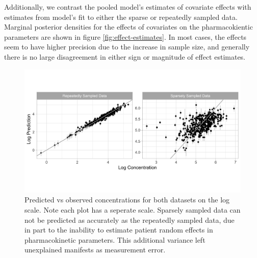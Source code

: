 Additionally, we contrast the pooled model's estimates of covariate
effects with estimates from model's fit to either the sparse or
repeatedly sampled data. Marginal posterior densities for the effects of
covariates on the pharmacokientic parameters are shown in figure
\ref{fig:effect-estimates}. In most cases, the effects seem to have
higher precision due to the increase in sample size, and generally there
is no large disagreement in either sign or magnitude of effect
estimates.



\begin{figure}
	
	{\centering \includegraphics[width=\linewidth]{figures/plot-model-predictions-1} 
		
	}
	
	\caption{Predicted vs observed concentrations for both datasets on the log scale. Note each plot has a seperate scale. Sparsely sampled data can not be predicted as accurately as the repeatedly sampled data, due in part to the inability to estimate patient random effects in pharmacokinetic parameters.  This additional variance left unexplained manifests as measurement error.}\label{fig:plot-model-predictions}
\end{figure}

